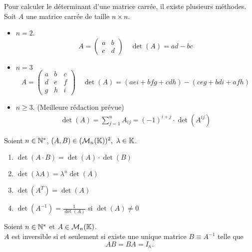\begin{proposition}
    Pour calculer le déterminant d'une matrice carrée, il existe plusieurs méthodes.
    Soit $A$ une matrice carrée de taille $n \times n$. 
    \begin{itemize}
        \item $n = 2$. 
        \[ 
        A = 
        \begin{pmatrix}
            a & b \\
            c & d
        \end{pmatrix}
        \quad 
        \det(A) = ad - bc 
        \]
        \item $n = 3$
        \[
        A = 
        \begin{pmatrix}
            a & b & c \\
            d & e & f \\
            g & h & i
        \end{pmatrix}
        \quad 
        \det(A) = (aei + bfg + cdh) - (ceg + bdi + afh)
        \]
        \item $n \geq 3$.
        (Meilleure rédaction prévue)
        \begin{align*}
            \det(A) = \sum_{j = 1}^{n} A_{ij} = (-1)^{i+j} \cdot \det(A^{ij})
        \end{align*}
    \end{itemize}
\end{proposition}

\begin{proposition}
	Soient $n \in \mathbb{N}^*$, $(A, B) \in (\mathcal{M}_n(\mathbb{K}))^2,\ \lambda \in \mathbb{K}$.
	\begin{multicols}{2}
	    \begin{enumerate}
		\item $\det(A \cdot B) = \det(A) \cdot \det(B)$
		\item $\det(\lambda A) = \lambda^n \det(A)$
		\item $\det(A^T) = \det(A)$
		\item $\det(A^{-1}) = \frac{1}{\det(A)}$ si $\det(A) \neq 0$
	\end{enumerate}
	\end{multicols}
\end{proposition}

\begin{definition}
	Soient $n \in \mathbb{N}^*$ et $A \in \mathcal{M}_n(\mathbb{K})$.
	\\
	$A$ est inversible si et seulement si existe une unique matrice $B \equiv A^{-1}$ telle que 
	\[AB = BA = I_n.\]
\end{definition}

